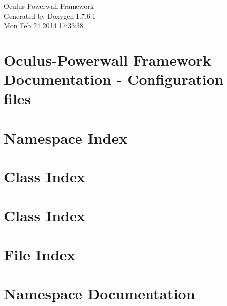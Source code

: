 \documentclass[a4paper]{book}
\begin{document}
\hypersetup{pageanchor=false,citecolor=blue}
\begin{titlepage}
\vspace*{7cm}
\begin{center}
{\Large \-Oculus-\/\-Powerwall \-Framework }\\
\vspace*{1cm}
{\large \-Generated by Doxygen 1.7.6.1}\\
\vspace*{0.5cm}
{\small Mon Feb 24 2014 17:33:38}\\
\end{center}
\end{titlepage}
\clearemptydoublepage
{}
\tableofcontents
\clearemptydoublepage
{}
\hypersetup{pageanchor=true,citecolor=blue}
\chapter{\-Oculus-\/\-Powerwall \-Framework \-Documentation -\/ \-Configuration files}
\label{index}\hypertarget{index}{}
\chapter{\-Namespace \-Index}

\chapter{\-Class \-Index}

\chapter{\-Class \-Index}

\chapter{\-File \-Index}

\chapter{\-Namespace \-Documentation}




















\end{document}
